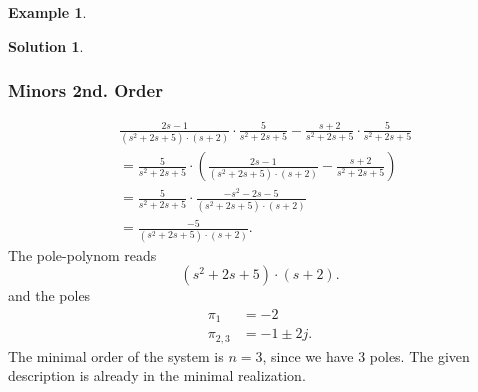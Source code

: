 \documentclass[a4paper,12 pt]{article}
\numberwithin{equation}{section}
\theoremstyle{definition}
\newtheorem{bsp}{Example}
\theoremstyle{remark}
\theoremstyle{definition}
\newtheorem*{lsg}{Solution}
\theoremstyle{definition}
\theoremstyle{definition}
\theoremstyle{remark}
\begin{document}
\begin{bsp}
\begin{lsg}
\begin{enumerate}[(a)]
\subsubsection*{Minors 2nd. Order}
\begin{equation*}
\begin{split}
&\frac{2s-1}{(s^2+2s+5)\cdot (s+2)} \cdot \frac{5}{s^2+2s+5}-\frac{s+2}{s^2+2s+5}\cdot \frac{5}{s^2+2s+5}\\
&=\frac{5}{s^2+2s+5}\cdot \left( \frac{2s-1}{(s^2+2s+5)\cdot (s+2)} -\frac{s+2}{s^2+2s+5}\right)\\
&=\frac{5}{s^2+2s+5}\cdot \frac{-s^2-2s-5}{(s^2+2s+5)\cdot (s+2)}\\
&=\frac{-5}{(s^2+2s+5)\cdot (s+2)}.
\end{split}
\end{equation*}
The pole-polynom reads
\begin{equation*}
(s^2+2s+5)\cdot (s+2).
\end{equation*}
and the poles
\begin{equation*}
\begin{split}
\pi_1 &=-2\\
\pi_{2,3}&=-1\pm 2j.
\end{split}
\end{equation*}
The minimal order of the system is $n=3$, since we have 3 poles. The given description is already in the minimal realization.

\end{enumerate}
\end{lsg}
\end{bsp}
\end{document}
